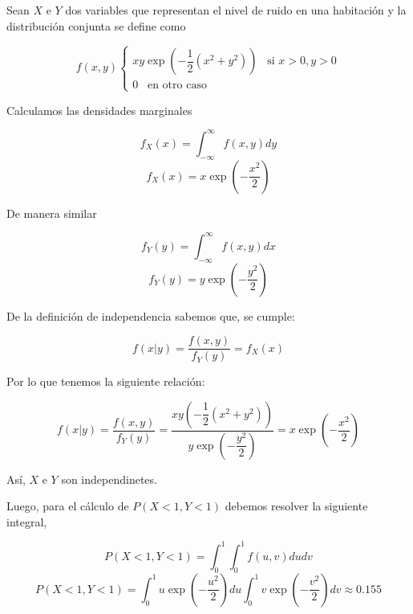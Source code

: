 
\addpoints
\question[15] Sean $X$ e $Y$ dos variables que representan el nivel de ruido en una habitación y la distribución conjunta se define como

$$f(x,y)
\begin{cases}
x y \exp\left(  -\dfrac{1}{2} (x^2 + y^2)  \right)  \hspace{10pt} \text{si } x>0, y>0   \\
0 \hspace{10pt} \text{en otro caso}
\end{cases}
$$

\noaddpoints
{}

\begin{solution}

Calculamos las densidades marginales 

$$f_X(x) = \int_{-\infty}^{\infty} f(x,y) dy $$
$$f_X(x) = x \exp\left(- \dfrac{x^2}{2}  \right)  $$

De manera similar 

$$f_Y(y) = \int_{-\infty}^{\infty} f(x,y) dx $$
$$f_Y(y) = y \exp\left(- \dfrac{y^2}{2}  \right)  $$

De la definición de independencia sabemos que, se cumple:

$$f(x|y)= \dfrac{f(x,y)}{f_Y(y)} =f_X(x)$$

Por lo que tenemos la siguiente relación:

$$ f(x|y)= \dfrac{f(x,y)}{f_Y(y)} =\dfrac{x y \left(  -\dfrac{1}{2} (x^2 + y^2)  \right) }{y \exp\left(- \dfrac{y^2}{2}  \right)} =  x \exp\left(- \dfrac{x^2}{2}  \right) $$

Así, $X$ e $Y$ son independinetes.

Luego, para el cálculo de $ P(X<1, Y<1)$ debemos resolver la siguiente integral,

$$ P(X<1, Y<1) = \int_{0}^{1} \int_{0}^{1} f(u,v) du dv$$
$$ P(X<1, Y<1) = \int_{0}^{1}  u \exp  \left( -\dfrac{u^2}{2}  \right) du \int_{0}^{1} v \exp  \left( -\dfrac{v^2}{2}  \right) dv \approx 0.155 $$

\end{solution}